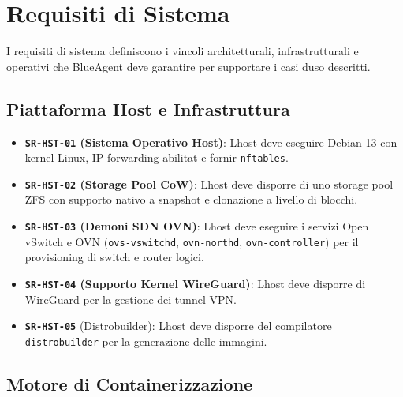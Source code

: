 \section{Requisiti di Sistema}\label{requisiti-di-sistema}

I requisiti di sistema definiscono i vincoli architetturali,
infrastrutturali e operativi che BlueAgent deve garantire per supportare
i casi d\textquotesingle uso descritti.

\subsection{Piattaforma Host e
Infrastruttura}\label{piattaforma-host-e-infrastruttura}

\begin{itemize}
\tightlist
\item
  \textbf{\passthrough{\lstinline!SR-HST-01!} (Sistema Operativo Host)}:
  L\textquotesingle host deve eseguire Debian 13 con kernel Linux, IP
  forwarding abilitat e fornir \passthrough{\lstinline!nftables!}.
\item
  \textbf{\passthrough{\lstinline!SR-HST-02!} (Storage Pool CoW)}:
  L\textquotesingle host deve disporre di uno storage pool ZFS con
  supporto nativo a snapshot e clonazione a livello di blocchi.
\item
  \textbf{\passthrough{\lstinline!SR-HST-03!} (Demoni SDN OVN)}:
  L\textquotesingle host deve eseguire i servizi Open vSwitch e OVN
  (\passthrough{\lstinline!ovs-vswitchd!},
  \passthrough{\lstinline!ovn-northd!},
  \passthrough{\lstinline!ovn-controller!}) per il provisioning di
  switch e router logici.
\item
  \textbf{\passthrough{\lstinline!SR-HST-04!} (Supporto Kernel
  WireGuard)}: L\textquotesingle host deve disporre di WireGuard per la
  gestione dei tunnel VPN.
\item
  \textbf{\passthrough{\lstinline!SR-HST-05!}} (Distrobuilder):
  L\textquotesingle host deve disporre del compilatore
  \passthrough{\lstinline!distrobuilder!} per la generazione delle
  immagini.
\end{itemize}

\subsection{Motore di
Containerizzazione}\label{motore-di-containerizzazione}

